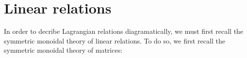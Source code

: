 



\section{Linear relations}

\label{sec:linear}

In order to decribe Lagrangian relations diagramatically, we must first recall the symmetric monoidal theory of linear relations.  To do so, we first recall the symmetric monoidal theory of matrices:

